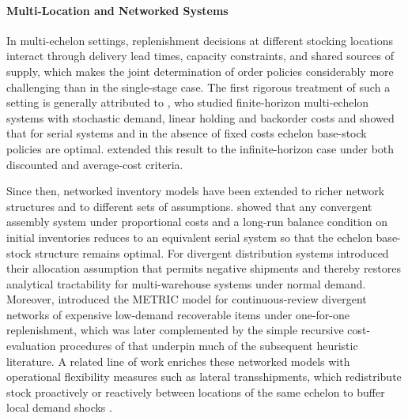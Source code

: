 \paragraph{\textbf{Multi-Location and Networked Systems}}
In multi-echelon settings, replenishment decisions at different stocking locations interact through delivery lead times, capacity constraints, and shared sources of supply, which makes the joint determination of order policies considerably more challenging than in the single-stage case. The first rigorous treatment of such a setting is generally attributed to \citet{clark1960multiechelon}, who studied finite-horizon multi-echelon systems with stochastic demand, linear holding and backorder costs and showed that for serial systems and in the absence of fixed costs echelon base-stock policies are optimal. \citet{federgruen1984multiechelon} extended this result to the infinite-horizon case under both discounted and average-cost criteria. 

Since then, networked inventory models have been extended to richer network structures and to different sets of assumptions. \citet{rosling1989multiechelon} showed that any convergent assembly system under proportional costs and a long-run balance condition on initial inventories reduces to an equivalent serial system so that the echelon base-stock structure remains optimal. For divergent distribution systems \citet{eppen1981multiechelon} introduced their allocation assumption that permits negative shipments and thereby restores analytical tractability for multi-warehouse systems under normal demand. Moreover, \citet{sherbrooke1968multiechelon} introduced the METRIC model for continuous-review divergent networks of expensive low-demand recoverable items under one-for-one replenishment, which was later complemented by the simple recursive cost-evaluation procedures of \citet{axsater1990multiechelon} that underpin much of the subsequent heuristic literature.
A related line of work enriches these networked models with operational flexibility measures such as lateral transshipments, which redistribute stock proactively or reactively between locations of the same echelon to buffer local demand shocks \citep[see][]{paterson2011multiechelon}.

